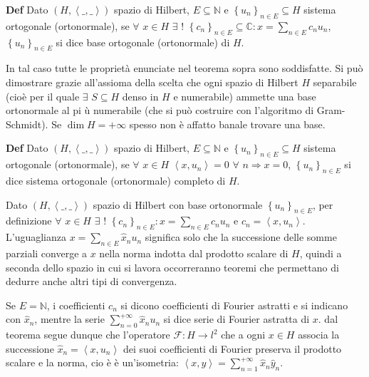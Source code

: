 \documentclass{article}
\begin{document}
\textbf{Def} Dato $\left( H,\left\langle \_,\_\right\rangle \right) $ spazio
di Hilbert, $E\subseteq 
\mathbb{N}
$ e $\left\{ u_{n}\right\} _{n\in E}\subseteq H$ sistema ortogonale
(ortonormale), se $\forall $ $x\in H$ $\exists $ $!$ $\left\{ c_{n}\right\}
_{n\in E}\subseteq 
\mathbb{C}
:x=\sum_{n\in E}c_{n}u_{n}$, $\left\{ u_{n}\right\} _{n\in E}$ si dice base
ortogonale (ortonormale) di $H$.

In tal caso tutte le propriet\`{a} enunciate nel teorema sopra sono
soddisfatte. Si pu\`{o} dimostrare grazie all'assioma della scelta che ogni
spazio di Hilbert $H$ separabile (cio\`{e} per il quale $\exists $ $%
S\subseteq H$ denso in $H$ e numerabile) ammette una base ortonormale al pi%
\`{u} numerabile (che si pu\`{o} costruire con l'algoritmo di Gram-Schmidt).
Se $\dim H=+\infty $ spesso non \`{e} affatto banale trovare una base.

\textbf{Def} Dato $\left( H,\left\langle \_,\_\right\rangle \right) $ spazio
di Hilbert, $E\subseteq 
\mathbb{N}
$ e $\left\{ u_{n}\right\} _{n\in E}\subseteq H$ sistema ortogonale
(ortonormale), se $\forall $ $x\in H$ $\left\langle x,u_{n}\right\rangle =0$ 
$\forall $ $n\Longrightarrow x=0$, $\left\{ u_{n}\right\} _{n\in E}$ si dice
sistema ortogonale (ortonormale) completo di $H$.


Dato $\left( H,\left\langle \_,\_\right\rangle \right) $ spazio di Hilbert
con base ortonormale $\left\{ u_{n}\right\} _{n\in E}$, per definizione $%
\forall $ $x\in H$ $\exists $ $!$ $\left\{ c_{n}\right\} _{n\in
E}:x=\sum_{n\in E}c_{n}u_{n}$ e $c_{n}=\left\langle x,u_{n}\right\rangle $.
L'uguaglianza $x=\sum_{n\in E}\hat{x}_{n}u_{n}$ significa solo che la
successione delle somme parziali converge a $x$ nella norma indotta dal
prodotto scalare di $H$, quindi a seconda dello spazio in cui si lavora
occorreranno teoremi che permettano di dedurre anche altri tipi di
convergenza.

Se $E=%
\mathbb{N}
$, i coefficienti $c_{n}$ si dicono coefficienti di Fourier astratti e si
indicano con $\hat{x}_{n}$, mentre la serie $\sum_{n=0}^{+\infty }\hat{x}%
_{n}u_{n}$ si dice serie di Fourier astratta di $x$. dal teorema segue
dunque che l'operatore $\mathcal{F}:H\rightarrow l^{2}$ che a ogni $x\in H$
associa la successione $\hat{x}_{n}=\left\langle x,u_{n}\right\rangle $ dei
suoi coefficienti di Fourier preserva il prodotto scalare e la norma, cio%
\`{e} \`{e} un'isometria: $\left\langle x,y\right\rangle
=\sum_{n=1}^{+\infty }\hat{x}_{n}\hat{y}_{n}$.
\end{document}
